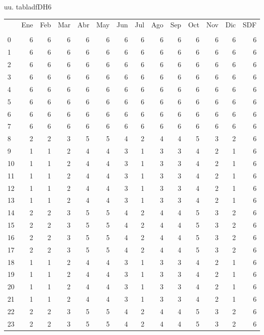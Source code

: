 \documentclass[a4paper,10pt,twocolumn]{article}
\begin{document}
\begin{Form}
uu. tabladfDH6


                    \begin{table}[H] \centering
                        {
                        \begin{tabular}{lrrrrrrrrrrrrr}
\toprule
 & Ene & Feb & Mar & Abr & May & Jun & Jul & Ago & Sep & Oct & Nov & Dic & SDF \\
 &  &  &  &  &  &  &  &  &  &  &  &  &  \\
\midrule
0 & 6 & 6 & 6 & 6 & 6 & 6 & 6 & 6 & 6 & 6 & 6 & 6 & 6 \\
1 & 6 & 6 & 6 & 6 & 6 & 6 & 6 & 6 & 6 & 6 & 6 & 6 & 6 \\
2 & 6 & 6 & 6 & 6 & 6 & 6 & 6 & 6 & 6 & 6 & 6 & 6 & 6 \\
3 & 6 & 6 & 6 & 6 & 6 & 6 & 6 & 6 & 6 & 6 & 6 & 6 & 6 \\
4 & 6 & 6 & 6 & 6 & 6 & 6 & 6 & 6 & 6 & 6 & 6 & 6 & 6 \\
5 & 6 & 6 & 6 & 6 & 6 & 6 & 6 & 6 & 6 & 6 & 6 & 6 & 6 \\
6 & 6 & 6 & 6 & 6 & 6 & 6 & 6 & 6 & 6 & 6 & 6 & 6 & 6 \\
7 & 6 & 6 & 6 & 6 & 6 & 6 & 6 & 6 & 6 & 6 & 6 & 6 & 6 \\
8 & 2 & 2 & 3 & 5 & 5 & 4 & 2 & 4 & 4 & 5 & 3 & 2 & 6 \\
9 & 1 & 1 & 2 & 4 & 4 & 3 & 1 & 3 & 3 & 4 & 2 & 1 & 6 \\
10 & 1 & 1 & 2 & 4 & 4 & 3 & 1 & 3 & 3 & 4 & 2 & 1 & 6 \\
11 & 1 & 1 & 2 & 4 & 4 & 3 & 1 & 3 & 3 & 4 & 2 & 1 & 6 \\
12 & 1 & 1 & 2 & 4 & 4 & 3 & 1 & 3 & 3 & 4 & 2 & 1 & 6 \\
13 & 1 & 1 & 2 & 4 & 4 & 3 & 1 & 3 & 3 & 4 & 2 & 1 & 6 \\
14 & 2 & 2 & 3 & 5 & 5 & 4 & 2 & 4 & 4 & 5 & 3 & 2 & 6 \\
15 & 2 & 2 & 3 & 5 & 5 & 4 & 2 & 4 & 4 & 5 & 3 & 2 & 6 \\
16 & 2 & 2 & 3 & 5 & 5 & 4 & 2 & 4 & 4 & 5 & 3 & 2 & 6 \\
17 & 2 & 2 & 3 & 5 & 5 & 4 & 2 & 4 & 4 & 5 & 3 & 2 & 6 \\
18 & 1 & 1 & 2 & 4 & 4 & 3 & 1 & 3 & 3 & 4 & 2 & 1 & 6 \\
19 & 1 & 1 & 2 & 4 & 4 & 3 & 1 & 3 & 3 & 4 & 2 & 1 & 6 \\
20 & 1 & 1 & 2 & 4 & 4 & 3 & 1 & 3 & 3 & 4 & 2 & 1 & 6 \\
21 & 1 & 1 & 2 & 4 & 4 & 3 & 1 & 3 & 3 & 4 & 2 & 1 & 6 \\
22 & 2 & 2 & 3 & 5 & 5 & 4 & 2 & 4 & 4 & 5 & 3 & 2 & 6 \\
23 & 2 & 2 & 3 & 5 & 5 & 4 & 2 & 4 & 4 & 5 & 3 & 2 & 6 \\
\bottomrule
\end{tabular}

}
\end{table}
\end{Form}
\end{document}
